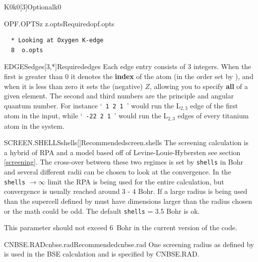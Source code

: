 \documentclass[11pt]{report}
\begin{document}
\begin{Card}{K0}{k0[3]}{Optional}{k0}
\begin{Card}{OPF.OPTS}{z z.opts}{Required}{opf.opts}
\begin{verbatim}
  * Looking at Oxygen K-edge
  8  o.opts
\end{verbatim}
\end{Card}


\begin{Card}{EDGES}{edges[3,*]}{Required}{edges}
Each edge entry consists of 3 integers. When the first is greater than 0 it denotes the {\bf index} of the atom (in the order set by ), and when it is less than zero it sets the (negative) $Z$, allowing you to specify {\bf all} of a given element.
The second and third numbers are the principle and angular quantum number.
For instance `\texttt{ 1 2 1 }' would run the L$_{2,3}$ edge of the first atom in the input, while `\texttt{ -22 2 1 }' would run the L$_{2,3}$ edges of every titanium atom in the system.

\end{Card}

\begin{Card}{SCREEN.SHELLS}{shells[]}{Recommended}{screen.shells}
The screening calculation is a hybrid of RPA and a model based off of Levine-Louie-Hybersten see section \ref{screening}. The cross-over between these two regimes is set by \texttt{shells} in Bohr and several different radii can be chosen to look at the convergence. In the \texttt{shells} $\rightarrow \infty$ limit the RPA is being used for the entire calculation, but convergence is usually reached around 3 - 4 Bohr. If a large radius is being used than the supercell defined by  must have dimensions larger than the radius chosen or the math could be odd. The default \texttt{shells} = 3.5 Bohr is ok.

This parameter should not exceed 6~Bohr in the current version of the code.
\end{Card}

\begin{Card}{CNBSE.RAD}{cnbse.rad}{Recommended}{cnbse.rad}
One screening radius as defined by  is used in the BSE calculation and is specified by CNBSE.RAD. 
\end{Card}


\end{Card}
\end{document}
